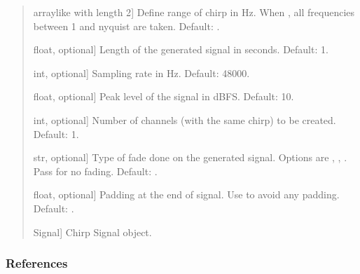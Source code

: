 \documentclass[letterpaper,10pt,english]{sphinxmanual}
\begin{document}
\begin{fulllineitems}
\begin{quote}
\begin{description}
\begin{description}
\sphinxlineitem{\sphinxstylestrong{range\_hz}}{[}array\sphinxhyphen{}like with length 2{]}
\sphinxAtStartPar
Define range of chirp in Hz. When , all frequencies between
1 and nyquist are taken. Default: .

\sphinxlineitem{\sphinxstylestrong{length\_seconds}}{[}float, optional{]}
\sphinxAtStartPar
Length of the generated signal in seconds. Default: 1.

\sphinxlineitem{\sphinxstylestrong{sampling\_rate\_hz}}{[}int, optional{]}
\sphinxAtStartPar
Sampling rate in Hz. Default: 48000.

\sphinxlineitem{\sphinxstylestrong{peak\_level\_dbfs}}{[}float, optional{]}
\sphinxAtStartPar
Peak level of the signal in dBFS. Default: \sphinxhyphen{}10.

\sphinxlineitem{\sphinxstylestrong{number\_of\_channels}}{[}int, optional{]}
\sphinxAtStartPar
Number of channels (with the same chirp) to be created. Default: 1.

\sphinxlineitem{\sphinxstylestrong{fade}}{[}str, optional{]}
\sphinxAtStartPar
Type of fade done on the generated signal. Options are ,
, . Pass  for no fading. Default: .

\sphinxlineitem{\sphinxstylestrong{padding\_end\_seconds}}{[}float, optional{]}
\sphinxAtStartPar
Padding at the end of signal. Use  to avoid any padding.
Default: .

\end{description}

\begin{description}
\sphinxlineitem{\sphinxstylestrong{chirp\_sig}}{[}Signal{]}
\sphinxAtStartPar
Chirp Signal object.

\end{description}

\end{description}\end{quote}
\subsubsection*{References}

\sphinxAtStartPar
{}

\end{fulllineitems}

\end{document}
